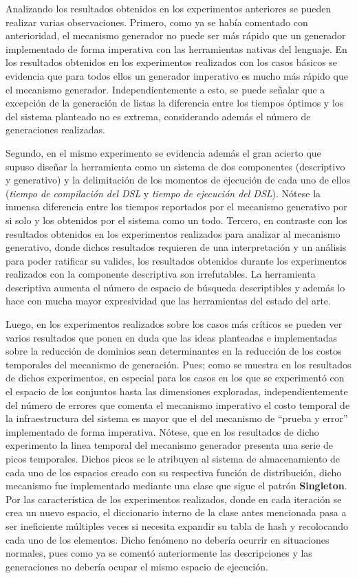 Analizando los resultados obtenidos en los experimentos anteriores se pueden realizar varias observaciones.
Primero, como ya se había comentado con anterioridad, el mecanismo generador no puede ser más
rápido que un generador implementado de forma imperativa con las herramientas nativas del lenguaje. En los
resultados obtenidos en los experimentos realizados con los casos básicos se evidencia que para todos ellos un generador
imperativo es mucho más rápido que el mecanismo generador. Independientemente a esto, se puede señalar que a
excepción de la generación de listas la diferencia entre los tiempos óptimos y los del sistema planteado no es
extrema, considerando además el número de generaciones realizadas.

Segundo, en el mismo experimento se evidencia además el gran acierto que supuso diseñar la herramienta
como un sistema de dos componentes (descriptivo y generativo) y la delimitación de los momentos de ejecución de cada uno de ellos
({\it tiempo de compilación del DSL} y {\it tiempo de ejecución del DSL}). Nótese la inmensa diferencia entre los 
tiempos reportados por el mecanismo generativo por si solo y los obtenidos por el sistema como un todo. 
Tercero, en contraste con los resultados obtenidos en los experimentos realizados para analizar al mecanismo generativo, donde
dichos resultados requieren de una interpretación y un análisis para poder ratificar su valides, los resultados
obtenidos durante los experimentos realizados con la componente descriptiva son irrefutables. La
herramienta descriptiva aumenta el número de espacio de búsqueda descriptibles y además lo hace con
mucha mayor expresividad que las herramientas del estado del arte.

Luego, en los experimentos realizados sobre los casos más críticos se pueden ver varios resultados que ponen en duda
que las ideas planteadas e implementadas sobre la reducción de dominios sean determinantes en la reducción de los
costos temporales del mecanismo de generación. Pues; como se muestra en los resultados de dichos experimentos,
en especial para los casos en los que se experimentó con el espacio de los conjuntos hasta las dimensiones exploradas,
independientemente del número de errores que comenta el mecanismo imperativo el costo temporal de la infraestructura del
sistema es mayor que el del mecanismo de “prueba y error” implementado de forma imperativa. Nótese, que en los resultados
de dicho experimento la linea temporal del mecanismo generador presenta una serie de picos temporales. Dichos picos se le
atribuyen al sistema de almacenamiento de cada uno de los espacios creado con su respectiva función de distribución,
dicho mecanismo fue implementado mediante una clase que sigue el patrón {\bf Singleton}. Por las característica de los experimentos
realizados, donde en cada iteración se crea un nuevo espacio, el diccionario interno de la clase antes mencionada pasa a ser
ineficiente múltiples veces si necesita expandir su tabla de hash y recolocando cada uno de los elementos. Dicho fenómeno no
debería ocurrir en situaciones normales, pues como ya se comentó anteriormente las descripciones y las generaciones no debería
ocupar el mismo espacio de ejecución.

